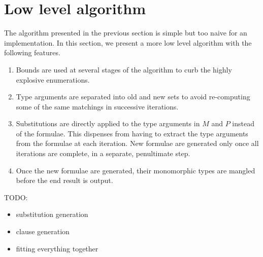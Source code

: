 \documentclass[]{ceurart}
\begin{document}
\section{Low level algorithm}
\label{sec:low-level-algorithm}

The algorithm presented in the previous section is simple but too naive for an implementation. In this section, we present a more low level algorithm with the following features.
\begin{enumerate}
    \item[\labelitemi] Bounds are used at several stages of the algorithm to curb the highly explosive enumerations.

    \item[\labelitemi] Type arguments are separated into old and new sets to avoid re-computing some of the same matchings in successive iterations.

    \item[\labelitemi] Substitutions are directly applied to the type arguments in $M$ and $P$ instead of the formulae. This dispenses from having to extract the type arguments from the formulae at each iteration. New formulae are generated only once all iterations are complete, in a separate, penultimate step.

    \item[\labelitemi] Once the new formulae are generated, their monomorphic types are mangled before the end result is output.
\end{enumerate}

TODO:
\begin{itemize}
   \item substitution generation
   \item clause generation
   \item fitting everything together
\end{itemize}
\end{document}
